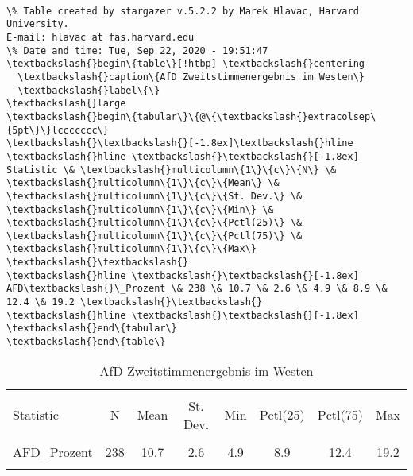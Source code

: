\documentclass[11pt]{article}
\makeatletter
\newcommand{\boxspacing}{\kern\kvtcb@left@rule\kern\kvtcb@boxsep}
\newcommand{\prompt}[4]{
        \ttfamily\llap{{\color{#2}[#3]:\hspace{3pt}#4}}\vspace{-\baselineskip}
    }
\makeatother
\begin{document}
    \begin{Verbatim}[commandchars=\\\{\}]

\% Table created by stargazer v.5.2.2 by Marek Hlavac, Harvard University.
E-mail: hlavac at fas.harvard.edu
\% Date and time: Tue, Sep 22, 2020 - 19:51:47
\textbackslash{}begin\{table\}[!htbp] \textbackslash{}centering
  \textbackslash{}caption\{AfD Zweitstimmenergebnis im Westen\}
  \textbackslash{}label\{\}
\textbackslash{}large
\textbackslash{}begin\{tabular\}\{@\{\textbackslash{}extracolsep\{5pt\}\}lccccccc\}
\textbackslash{}\textbackslash{}[-1.8ex]\textbackslash{}hline
\textbackslash{}hline \textbackslash{}\textbackslash{}[-1.8ex]
Statistic \& \textbackslash{}multicolumn\{1\}\{c\}\{N\} \& \textbackslash{}multicolumn\{1\}\{c\}\{Mean\} \&
\textbackslash{}multicolumn\{1\}\{c\}\{St. Dev.\} \& \textbackslash{}multicolumn\{1\}\{c\}\{Min\} \&
\textbackslash{}multicolumn\{1\}\{c\}\{Pctl(25)\} \& \textbackslash{}multicolumn\{1\}\{c\}\{Pctl(75)\} \&
\textbackslash{}multicolumn\{1\}\{c\}\{Max\} \textbackslash{}\textbackslash{}
\textbackslash{}hline \textbackslash{}\textbackslash{}[-1.8ex]
AFD\textbackslash{}\_Prozent \& 238 \& 10.7 \& 2.6 \& 4.9 \& 8.9 \& 12.4 \& 19.2 \textbackslash{}\textbackslash{}
\textbackslash{}hline \textbackslash{}\textbackslash{}[-1.8ex]
\textbackslash{}end\{tabular\}
\textbackslash{}end\{table\}
    \end{Verbatim}

\begin{table}[!htbp] \centering 
  \caption{AfD Zweitstimmenergebnis im Westen} 
  \label{} 
\large 
\begin{tabular}{@{\extracolsep{5pt}}lccccccc} 
\\[-1.8ex]\hline 
\hline \\[-1.8ex] 
Statistic & \multicolumn{1}{c}{N} & \multicolumn{1}{c}{Mean} & \multicolumn{1}{c}{St. Dev.} & \multicolumn{1}{c}{Min} & \multicolumn{1}{c}{Pctl(25)} & \multicolumn{1}{c}{Pctl(75)} & \multicolumn{1}{c}{Max} \\ 
\hline \\[-1.8ex] 
AFD\_Prozent & 238 & 10.7 & 2.6 & 4.9 & 8.9 & 12.4 & 19.2 \\ 
\hline \\[-1.8ex] 
\end{tabular} 
\end{table} 
    \begin{tcolorbox}[breakable, size=fbox, boxrule=1pt, pad at break*=1mm,colback=cellbackground, colframe=cellborder]
\prompt{In}{incolor}{ }{\boxspacing}
\begin{Verbatim}[commandchars=\\\{\}]

\end{Verbatim}
\end{tcolorbox}
\end{document}
